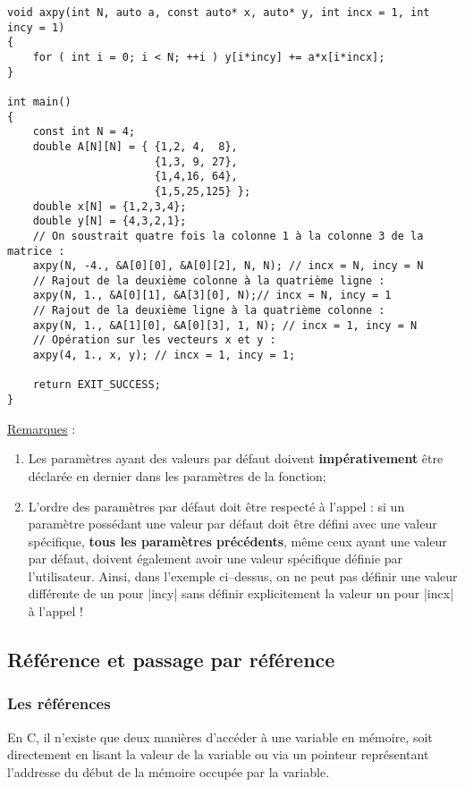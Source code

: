 \begin{lstlisting}[caption=Valeurs par défaut pour la fonction axpy]
void axpy(int N, auto a, const auto* x, auto* y, int incx = 1, int incy = 1)
{
    for ( int i = 0; i < N; ++i ) y[i*incy] += a*x[i*incx];
}

int main()
{
    const int N = 4;
    double A[N][N] = { {1,2, 4,  8}, 
                       {1,3, 9, 27},
                       {1,4,16, 64},
                       {1,5,25,125} };
    double x[N] = {1,2,3,4};
    double y[N] = {4,3,2,1};
    // On soustrait quatre fois la colonne 1 à la colonne 3 de la matrice :
    axpy(N, -4., &A[0][0], &A[0][2], N, N); // incx = N, incy = N
    // Rajout de la deuxième colonne à la quatrième ligne :
    axpy(N, 1., &A[0][1], &A[3][0], N);// incx = N, incy = 1
    // Rajout de la deuxième ligne à la quatrième colonne :
    axpy(N, 1., &A[1][0], &A[0][3], 1, N); // incx = 1, incy = N
    // Opération sur les vecteurs x et y :
    axpy(4, 1., x, y); // incx = 1, incy = 1;

    return EXIT_SUCCESS;
}
\end{lstlisting}

\underline{Remarques} :
\begin{enumerate}
    \item Les paramètres ayant des valeurs par défaut doivent \textbf{impérativement} être déclarée en dernier dans les paramètres de la fonction;
    \item L'ordre des paramètres par défaut doit être respecté à l'appel : si un paramètre possédant une valeur par défaut doit être défini avec une valeur spécifique, \textbf{tous les paramètres précédents}, même ceux ayant une valeur par défaut, doivent également avoir une valeur spécifique définie par l'utilisateur. Ainsi, dans l'exemple ci--dessus, on ne peut pas définir une valeur différente de un pour |incy| sans définir explicitement la valeur un pour |incx| à l'appel !
\end{enumerate}

\subsection{Référence et passage par référence}

\subsubsection{Les références}

En C, il n'existe que deux manières d'accéder à une variable en mémoire, soit directement en lisant la valeur de la variable  ou via un pointeur représentant l'addresse du début de la mémoire occupée par la variable.

